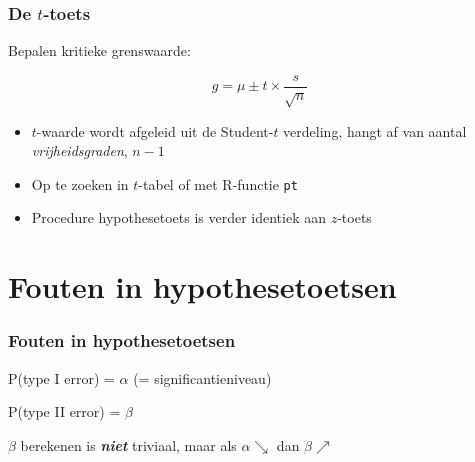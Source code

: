 \documentclass[aspectratio=169]{beamer}
\begin{document}
\begin{frame}
  \frametitle{De $t$-toets}
  
  Bepalen kritieke grenswaarde:
  
  \[ g = \mu \pm t \times \frac{s}{\sqrt{n}} \]
  
  \begin{itemize}
    \item $t$-waarde wordt afgeleid uit de Student-$t$ verdeling, hangt af van aantal \textit{vrijheidsgraden}, $n-1$
    \item Op te zoeken in $t$-tabel of met R-functie \texttt{pt}
    \item Procedure hypothesetoets is verder identiek aan $z$-toets
  \end{itemize}
  
\end{frame}

\section{Fouten in hypothesetoetsen}

\begin{frame}
  \frametitle{Fouten in hypothesetoetsen}
  
  \begin{table}
    \centering
    \label{tab:hypfouten}
  \end{table}
  
  P(type I error) = $\alpha$ (= significantieniveau)
  
  P(type II error) = $\beta$
  
  $\beta$ berekenen is \textbf{\textit{niet}} triviaal, maar als $\alpha \searrow$ dan $\beta \nearrow$ 
\end{frame}
\end{document}
